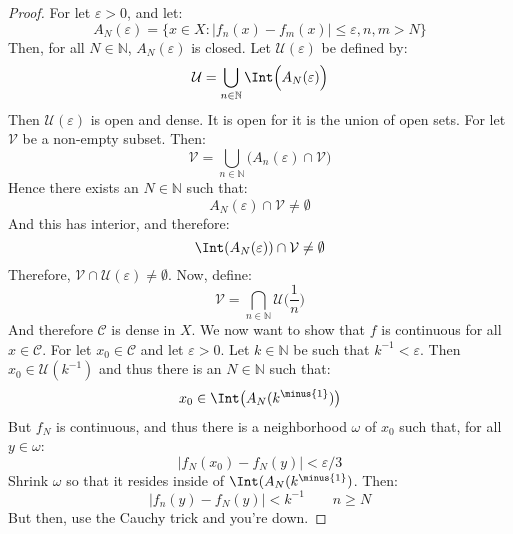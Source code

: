     \begin{proof}
    For let $\varepsilon>0$, and let:
    \begin{equation}
        A_{N}(\varepsilon)=
        \{x\in{X}:|f_{n}(x)-f_{m}(x)|\leq\varepsilon,n,m>N\}
    \end{equation}
    Then, for all $N\in\mathbb{N}$, $A_{N}(\varepsilon)$ is
    closed. Let $\mathcal{U}(\varepsilon)$ be defined by:
    \begin{equation}
        \mathcal{U}=\bigcup_{n\in\mathbb{N}}
            \Int\Big(A_{N}(\varepsilon)\Big)
    \end{equation}
    Then $\mathcal{U}(\varepsilon)$ is open and dense. It
    is open for it is the union of open sets. For let
    $\mathcal{V}$ be a non-empty subset. Then:
    \begin{equation}
        \mathcal{V}=\bigcup_{n\in\mathbb{N}}
            \Big(A_{n}(\varepsilon)\cap\mathcal{V}\Big)
    \end{equation}
    Hence there exists an $N\in\mathbb{N}$ such that:
    \begin{equation}
        A_{N}(\varepsilon)\cap\mathcal{V}\ne\emptyset
    \end{equation}
    And this has interior, and therefore:
    \begin{equation}
        \Int(A_{N}(\varepsilon))\cap\mathcal{V}\ne\emptyset
    \end{equation}
    Therefore,
    $\mathcal{V}\cap\mathcal{U}(\varepsilon)\ne\emptyset$.
    Now, define:
    \begin{equation}
        \mathcal{V}=\bigcap_{n\in\mathbb{N}}
            \mathcal{U}\big(\frac{1}{n}\big)
    \end{equation}
    And therefore $\mathcal{C}$ is dense in $X$. We
    now want to show that $f$ is continuous for all
    $x\in\mathcal{C}$. For let $x_{0}\in\mathcal{C}$ and
    let $\varepsilon>0$. Let $k\in\mathbb{N}$ be such that
    $k^{\minus{1}}<\varepsilon$. Then
    $x_{0}\in\mathcal{U}(k^{\minus{1}})$ and thus there is
    an $N\in\mathbb{N}$ such that:
    \begin{equation}
        x_{0}\in\Int\big(A_{N}(k^{\minus{1}})\big)
    \end{equation}
    But $f_{N}$ is continuous, and thus there is a
    neighborhood $\omega$ of $x_{0}$ such that, for all
    $y\in\omega$:
    \begin{equation}
        |f_{N}(x_{0})-f_{N}(y)|<\varepsilon/3
    \end{equation}
    Shrink $\omega$ so that it resides inside of
    $\Int(A_{N}(k^{\minus{1}})$. Then:
    \begin{equation}
        |f_{n}(y)-f_{N}(y)|<k^{\minus{1}}
        \quad\quad
        n\geq{N}
    \end{equation}
    But then, use the Cauchy trick and you're down.
\end{proof}
